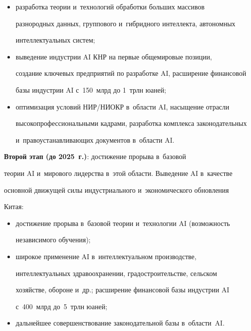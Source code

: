      \begin{itemize}


\item разработка теории и~технологий обработки больших массивов 


разнородных данных, группового и~гибридного интеллекта, автономных 


интеллектуальных систем;


\item выведение индустрии AI КНР на первые общемировые позиции, 


создание ключевых предприятий по разработке AI, расширение финансовой 


базы индустрии AI с~150~млрд до 1~трлн юаней;


\item оптимизация условий НИР\!/\!НИОКР в~об\-ласти AI, насыщение отрасли 


высокопрофессиональными кадрами, разработка комплекса законодательных 


и~правоустанавливающих документов в~об\-ласти AI.


\end{itemize}


     


     \textbf{Второй этап (до 2025~г.)}: достижение прорыва в~базовой 


теории AI и~мирового лидерства в~этой области. Выведение AI в~качестве 


основной движущей силы индустриального и~экономического обновления 


Китая:


     \begin{itemize}


\item достижение прорыва в~базовой тео\-рии и~технологии AI (воз\-мож\-ность 


независимого обуче\-ния);


\item широкое применение AI в~интеллектуальном производстве, 


интеллектуальных здравоохранении, градостроительстве, сельском 


хозяйстве, обороне и~др.; расширение финансовой базы индустрии AI 


с~400~млрд до~5~трлн юаней;


\item дальнейшее совершенствование законодательной базы в~об\-ласти~AI.


     \end{itemize}



